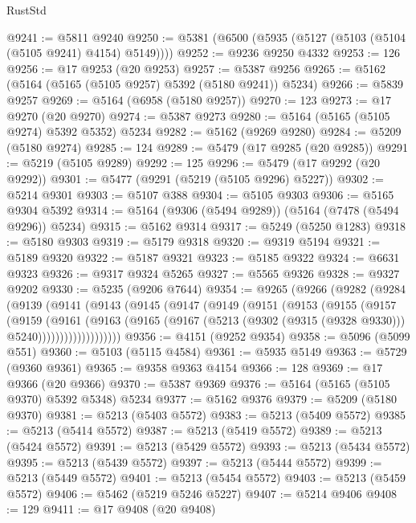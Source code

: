 \begin{lexlean}{RustStd}
\begin{coremodule}
@9241 := @5811 @9240
@9250 := @5381 (@6500 (@5935 (@5127 (@5103 (@5104 (@5105 @9241) @4154) @5149))))
@9252 := @9236 @9250 @4332
@9253 := 126
@9256 := @17 @9253 (@20 @9253)
@9257 := @5387 @9256
@9265 := @5162 (@5164 (@5165 (@5105 @9257) @5392 (@5180 @9241)) @5234)
@9266 := @5839 @9257
@9269 := @5164 (@6958 (@5180 @9257))
@9270 := 123
@9273 := @17 @9270 (@20 @9270)
@9274 := @5387 @9273
@9280 := @5164 (@5165 (@5105 @9274) @5392 @5352) @5234
@9282 := @5162 (@9269 @9280)
@9284 := @5209 (@5180 @9274)
@9285 := 124
@9289 := @5479 (@17 @9285 (@20 @9285))
@9291 := @5219 (@5105 @9289)
@9292 := 125
@9296 := @5479 (@17 @9292 (@20 @9292))
@9301 := @5477 (@9291 (@5219 (@5105 @9296) @5227))
@9302 := @5214 @9301
@9303 := @5107 @388
@9304 := @5105 @9303
@9306 := @5165 @9304 @5392
@9314 := @5164 (@9306 (@5494 @9289)) (@5164 (@7478 (@5494 @9296)) @5234)
@9315 := @5162 @9314
@9317 := @5249 (@5250 @1283)
@9318 := @5180 @9303
@9319 := @5179 @9318
@9320 := @9319 @5194
@9321 := @5189 @9320
@9322 := @5187 @9321
@9323 := @5185 @9322
@9324 := @6631 @9323
@9326 := @9317 @9324 @5265
@9327 := @5565 @9326
@9328 := @9327 @9202
@9330 := @5235 (@9206 @7644)
@9354 := @9265
    (@9266
      (@9282
        (@9284
          (@9139
            (@9141
              (@9143
                (@9145
                  (@9147
                    (@9149
                      (@9151
                        (@9153
                          (@9155
                            (@9157
                              (@9159
                                (@9161
                                  (@9163
                                    (@9165
                                      (@9167
                                        (@5213
                                          (@9302 (@9315 (@9328 @9330)))
                                          @5240)))))))))))))))))))
@9356 := @4151 (@9252 @9354)
@9358 := @5096 (@5099 @551)
@9360 := @5103 (@5115 @4584)
@9361 := @5935 @5149
@9363 := @5729 (@9360 @9361)
@9365 := @9358 @9363 @4154
@9366 := 128
@9369 := @17 @9366 (@20 @9366)
@9370 := @5387 @9369
@9376 := @5164 (@5165 (@5105 @9370) @5392 @5348) @5234
@9377 := @5162 @9376
@9379 := @5209 (@5180 @9370)
@9381 := @5213 (@5403 @5572)
@9383 := @5213 (@5409 @5572)
@9385 := @5213 (@5414 @5572)
@9387 := @5213 (@5419 @5572)
@9389 := @5213 (@5424 @5572)
@9391 := @5213 (@5429 @5572)
@9393 := @5213 (@5434 @5572)
@9395 := @5213 (@5439 @5572)
@9397 := @5213 (@5444 @5572)
@9399 := @5213 (@5449 @5572)
@9401 := @5213 (@5454 @5572)
@9403 := @5213 (@5459 @5572)
@9406 := @5462 (@5219 @5246 @5227)
@9407 := @5214 @9406
@9408 := 129
@9411 := @17 @9408 (@20 @9408)

\end{coremodule}
\end{lexlean}
